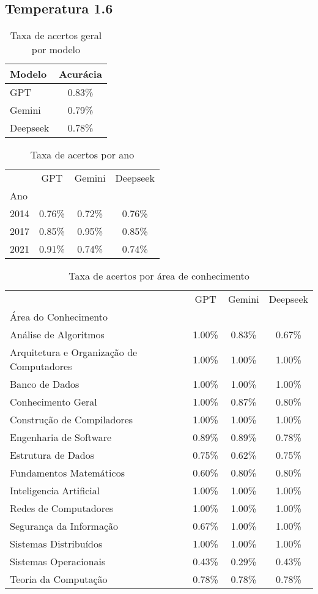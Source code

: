 \subsection{Temperatura 1.6}

\begin{table}[H]
\centering
\caption{Taxa de acertos geral por modelo}
\label{tab:acuracia_geral}
\begin{tabular}{l c}
\toprule
Modelo & Acurácia \\
\midrule
GPT & 0.83\% \\
Gemini & 0.79\% \\
Deepseek & 0.78\% \\
\bottomrule
\end{tabular}
\end{table}


\begin{table}[H]
\centering
\caption{Taxa de acertos por ano}
\label{tab:acuracia_ano}
\begin{tabular}{l c c c}
\toprule
 & GPT & Gemini & Deepseek \\
Ano &  &  &  \\
\midrule
2014 & 0.76\% & 0.72\% & 0.76\% \\
2017 & 0.85\% & 0.95\% & 0.85\% \\
2021 & 0.91\% & 0.74\% & 0.74\% \\
\bottomrule
\end{tabular}
\end{table}


\begin{table}[H]
\centering
\caption{Taxa de acertos por área de conhecimento}
\label{tab:acuracia_area}
\begin{tabular}{l c c c}
\toprule
 & GPT & Gemini & Deepseek \\
Área do Conhecimento &  &  &  \\
\midrule
Análise de Algoritmos & 1.00\% & 0.83\% & 0.67\% \\
Arquitetura e Organização de Computadores & 1.00\% & 1.00\% & 1.00\% \\
Banco de Dados & 1.00\% & 1.00\% & 1.00\% \\
Conhecimento Geral & 1.00\% & 0.87\% & 0.80\% \\
Construção de Compiladores & 1.00\% & 1.00\% & 1.00\% \\
Engenharia de Software & 0.89\% & 0.89\% & 0.78\% \\
Estrutura de Dados & 0.75\% & 0.62\% & 0.75\% \\
Fundamentos Matemáticos & 0.60\% & 0.80\% & 0.80\% \\
Inteligencia Artificial & 1.00\% & 1.00\% & 1.00\% \\
Redes de Computadores & 1.00\% & 1.00\% & 1.00\% \\
Segurança da Informação & 0.67\% & 1.00\% & 1.00\% \\
Sistemas Distribuídos & 1.00\% & 1.00\% & 1.00\% \\
Sistemas Operacionais & 0.43\% & 0.29\% & 0.43\% \\
Teoria da Computação & 0.78\% & 0.78\% & 0.78\% \\
\bottomrule
\end{tabular}
\end{table}
